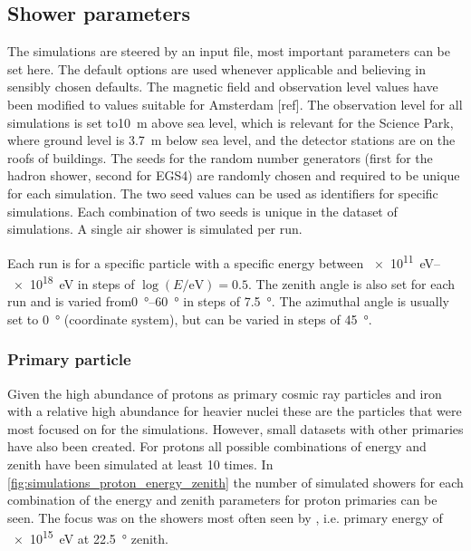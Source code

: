 

\subsection{Shower parameters}

The simulations are steered by an input file, most important parameters can be set here. The default options are used whenever applicable and believing in sensibly chosen defaults. The magnetic field and observation level values have been modified to values suitable for Amsterdam [ref]. The observation level for all simulations is set to\SI{10}{\meter} above sea level, which is relevant for the Science Park, where ground level is \SI{3.7}{\meter} below sea level, and the detector stations are on the roofs of buildings. The seeds for the random number generators (first for the hadron shower, second for EGS4) are randomly chosen and required to be unique for each simulation. The two seed values can be used as identifiers for specific simulations. Each combination of two seeds is unique in the dataset of simulations. A single air shower is simulated per run.

Each run is for a specific particle with a specific energy between \SIrange{e11}{e18}{\eV} in steps of $\log \left(E / \si{\eV}\right) = 0.5$. The zenith angle is also set for each run and is varied from\SIrange{0}{60}{\degree} in steps of \SI{7.5}{\degree}. The azimuthal angle is usually set to \SI{0}{\degree} (\hisparc coordinate system), but can be varied in steps of \SI{45}{\degree}.


\subsubsection{Primary particle}

Given the high abundance of protons as primary cosmic ray particles and iron with a relative high abundance for heavier nuclei these are the particles that were most focused on for the simulations. However, small datasets with other primaries have also been created. For protons all possible combinations of energy and zenith have been simulated at least 10 times. In \cref{fig:simulations_proton_energy_zenith} the number of simulated showers for each combination of the energy and zenith parameters for proton primaries can be seen. The focus was on the showers most often seen by \hisparc, i.e. primary energy of \SI{e15}{\eV} at \SI{22.5}{\degree} zenith.


